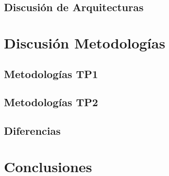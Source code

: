 \documentclass[a4paper, 11pt]{article}
\begin{document}


\subsection{Discusión de Arquitecturas}

\newpage
\section{Discusión Metodologías}
\subsection{Metodologías TP1}
\subsection{Metodologías TP2}
\subsection{Diferencias}

\newpage
\section{Conclusiones}
\end{document}
